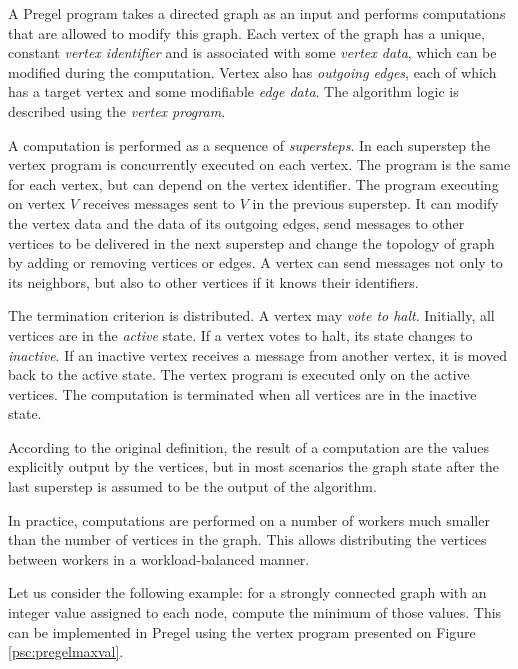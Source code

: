 A Pregel program takes a directed graph as an input and performs computations that are allowed to modify this graph.
Each vertex of the graph has a unique, constant \emph{vertex identifier} and is associated with some \emph{vertex data}, which can be modified during the computation. Vertex also has \emph{outgoing edges}, each of which has a target vertex and some modifiable \emph{edge data}. The algorithm logic is described using the \emph{vertex program}.

A computation is performed as a sequence of \emph{supersteps}. In each superstep the vertex program is concurrently executed on each vertex. The program is the same for each vertex, but can depend on the vertex identifier. The program executing on vertex $V$ receives messages sent to $V$ in the previous superstep. It can modify the vertex data and the data of its outgoing edges, send messages to other vertices to be delivered in the next superstep and change the topology of graph by adding or removing vertices or edges. A vertex can send messages not only to its neighbors, but also to other vertices if it knows their identifiers.

The termination criterion is distributed. A vertex may \emph{vote to halt}. Initially, all vertices are in the \emph{active} state. If a vertex votes to halt, its state changes to \emph{inactive}. If an inactive vertex receives a message from another vertex, it is moved back to the active state. The vertex program is executed only on the active vertices. The computation is terminated when all vertices are in the inactive state.

According to the original definition, the result of a computation are the values explicitly output by the vertices, but in most scenarios the graph state after the last superstep is assumed to be the output of the algorithm.

In practice, computations are performed on a number of workers much smaller than the number of vertices in the graph. This allows distributing the vertices between workers in a workload-balanced manner.

Let us consider the following example: for a strongly connected graph with an integer value assigned to each node, compute the minimum of those values. This can be implemented in Pregel using the vertex program presented on Figure \ref{psc:pregelmaxval}.

